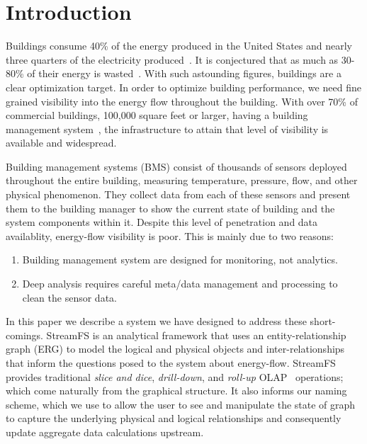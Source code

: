 \section{Introduction}%
Buildings consume 40\% of the energy produced in the United States and nearly three quarters of 
the electricity produced~\cite{epabuildings}.  It is conjectured that as much as 30-80\% of their energy is 
wasted~\cite{waste_science, next10_waste}.  With such astounding figures, buildings are a clear optimization
target.  In order to optimize building performance, we need fine grained visibility into the energy flow
throughout the building.  With over 70\% of commercial buildings, 100,000 square feet or 
larger, having a building management system~\cite{cbecs2003}, the infrastructure to attain that level of 
visibility is available and widespread.  

Building management systems (BMS) consist of thousands of sensors
deployed throughout the entire building, measuring temperature, pressure, flow, and other physical phenomenon.
They collect data from each of these sensors and present them to the building manager to show the current
state of building and the system components within it. 
Despite this level of penetration and data availablity, energy-flow visibility is poor. 
This is mainly due to two reasons:

\begin{enumerate}
\item Building management system are designed for monitoring, not analytics.
\item Deep analysis requires careful meta/data management and processing to clean the sensor data.
\end{enumerate}
\vspace{0.08in}

In this paper we describe a system we have designed to address these short-comings.  StreamFS is an
analytical framework that uses an entity-relationship graph (ERG) to model the logical and physical objects and 
inter-relationships that inform the questions posed to the system about energy-flow.
StreamFS provides traditional \emph{slice and dice}, \emph{drill-down}, and \emph{roll-up} OLAP~\cite{olap} 
operations; which come naturally from the graphical structure.  It also informs 
our naming scheme, which we use to allow the user to see and manipulate the state of graph
to capture the underlying physical and logical relationships and consequently update aggregate
data calculations upstream.


